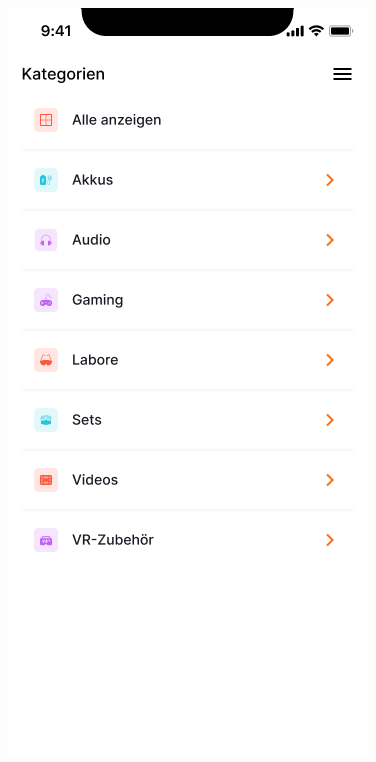 \begin{figure}[h]
    \centering
    \includegraphics[scale=0.3]{Bilder/Prototyp/Kategorein 1.png}

\end{figure}
